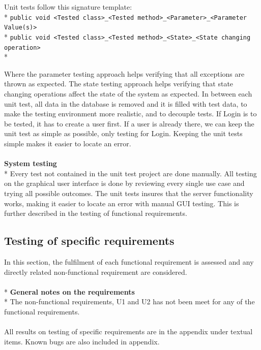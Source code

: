 \documentclass[a4paper,11pt,report]{article}
\begin{document}
Unit tests follow this signature template:
\\*
\verb|public void <Tested class>_<Tested method>_<Parameter>_<Parameter Value(s)>|
\\*
\verb|public void <Tested class>_<Tested method>_<State>_<State changing operation>|
\\*

Where the parameter testing approach helps verifying that all exceptions are thrown as expected. The state testing approach helps verifying that state changing operations affect the state of the system as expected. In between each unit test, all data in the database is removed and it is filled with test data, to make the testing environment more realistic, and to decouple tests. If Login is to be tested, it has to create a user first. If a user is already there, we can keep the unit test as simple as possible, only testing for Login. Keeping the unit tests simple makes it easier to locate an error. \\ \\
\textbf{System testing}\\*
Every test not contained in the unit test project are done manually. All testing on the graphical user interface is done by reviewing every single use case and trying all possible outcomes. The unit tests insures that the server functionality works, making it easier to locate an error with manual GUI testing. This is further described in the testing of functional requirements.


\subsection{Testing of specific requirements}
In this section, the fulfilment of each functional requirement is assessed and any directly related non-functional requirement are considered. \\ \\*
\textbf{General notes on the requirements} \\*
The non-functional requirements, U1 and U2 has not been meet for any of the functional requirements. \\ \\
All results on testing of specific requirements are in the appendix under textual items. Known bugs are also included in appendix.
\end{document}

